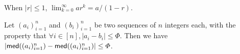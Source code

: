 \begin{fact} \label{fact:geometric-series-limit}
    When $|r| \le 1$, $\lim_{k = 0}^\infty a r^k = a / (1 - r)$.
\end{fact}

\begin{fact} \label{fact:seq-med}
    \emph{\cite{EC:BGKRZ21}}
    Let $(a_i)^n_{i = 1}$ and $(b_i)^n_{i = 1}$ be two sequences of $n$ integers
    each, with the property that $\forall i \in [n], |a_i - b_i| \le \varPhi$.
    Then we have $| \mathsf{med}((a_i)^n_{i = 1}) - \mathsf{med}((a_i)^n_{i = 1})| \le \varPhi$.
\end{fact}






